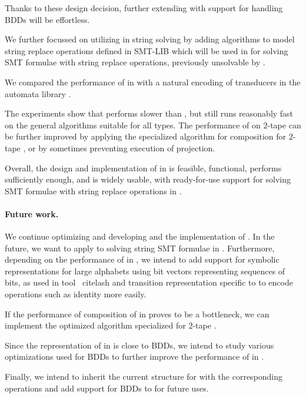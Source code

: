Thanks to these design decision, further extending \mata with support for handling BDDs will be effortless.

We further focussed on utilizing \nfts in string solving by adding algorithms to model string replace operations defined in SMT-LIB which will be used in \noodler for solving SMT formulae with string replace operations, previously unsolvable by \noodler.

We compared the performance of \nfts in \mata with a natural encoding of transducers in the automata library \mona.

The experiments show that \mata performs slower than \mona, but still runs reasonably fast on the general algorithms suitable for all \nft types.
The performance of \mata on $2$-tape \nfts can be further improved by applying the specialized algorithm for composition for $2$-tape \nfts, or by sometimes preventing execution of projection.

Overall, the design and implementation of \nfts in \mata is feasible, functional, performs sufficiently enough, and is widely usable, with ready-for-use support for solving SMT formulae with string replace operations in \noodler.

\paragraph{Future work.}
We continue optimizing and developing \mata and the implementation of \nfts.
In the future, we want to apply \nfts to solving string SMT formulae in \noodler.
Furthermore, depending on the performance of \nfts in \noodler, we intend to add support for symbolic representations for large alphabets using bit vectors representing sequences of bits, as used in tool \lash~cite{lash} and transition representation specific to \nfts to encode \nft operations such as identity more easily.

If the performance of composition of \nfts in \noodler proves to be a bottleneck, we can implement the optimized algorithm specialized for $2$-tape \nfts.

Since the representation of \nfts in \mata is close to BDDs, we intend to study various optimizations used for BDDs to further improve the performance of \nfts in \mata.

Finally, we intend to inherit the current structure for \nfts with the corresponding operations and add support for BDDs to \mata for future uses.



% 
